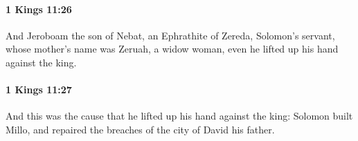 		\paragraph{1 Kings 11:26} %
			\label{1KINGS-11-26}

			And Jeroboam the son of Nebat, an Ephrathite of Zereda, Solomon’s servant, whose mother’s name was Zeruah, a widow woman, even he lifted up his hand against the king.


		\paragraph{1 Kings 11:27} %
			\label{1KINGS-11-27}

			And this was the cause that he lifted up his hand against the king: Solomon built Millo, and repaired the breaches of the city of David his father.


